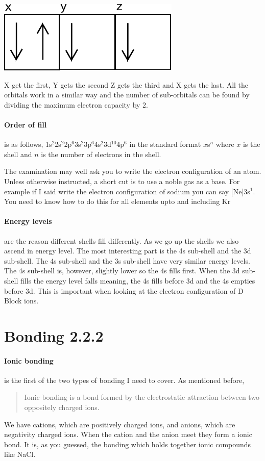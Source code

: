 	\begin{center}
		\includegraphics{P4orbital}
	\end{center}

	X get the first, Y gets the second Z gets the third and X gets the last.
	All the orbitals work in a similar way and the number of sub-orbitals can be found by dividing the maximum electron capacity by 2.
	
	\paragraph{Order of fill} is as follows, 1s$^2$2s$^2$2p$^6$3s$^2$3p$^6$4s$^2$3d$^{10}$4p$^6$ in the standard format $x$s$^n$ where $x$ is the shell and $n$ is the number of electrons in the shell.
	
	The examination may well ask you to write the electron configuration of an atom.
	Unless otherwise instructed, a short cut is to use a noble gas as a base.
	For example if I said write the electron configuration of sodium you can say [Ne]3s$^1$.
	You need to know how to do this for all elements upto and including Kr
	
	\paragraph{Energy levels} are the reason different shells fill differently.
	As we go up the shells we also ascend in energy level.
	The most interesting part is the 4s sub-shell and the 3d sub-shell.
	The 4s sub-shell and the 3s sub-shell have very similar energy levels.
	The 4s sub-shell is, however, slightly lower so the 4s fills first.
	When the 3d sub-shell fills the energy level falls meaning, the 4s fills before 3d and the 4s empties before 3d.
	This is important when looking at the electron configuration of D Block ions.
	
\section{Bonding 2.2.2}

	\paragraph{Ionic bonding} is the first of the two types of bonding I need to cover.
	As mentioned before,
	\begin{quote}
		Ionic bonding is a bond formed by the electrostatic attraction between two oppositely charged ions.
	\end{quote}
	We have cations, which are positively charged ions, and anions, which are negativity charged ions. When the cation and the anion meet they form a ionic bond. It is, as you guessed, the bonding which holds together ionic compounds like NaCl.
	 
